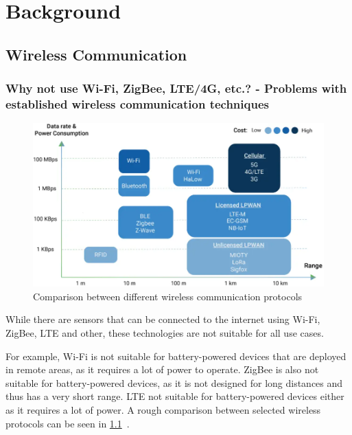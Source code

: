 \chapter{Background}

\section{Wireless Communication}


\subsection{Why not use Wi-Fi, ZigBee, \ac{LTE}/4G, etc.? - Problems with established wireless communication techniques}

\begin{figure}[h]
    \centering
    \includegraphics[width=1\textwidth]{pictures/lora/comparison-wireless-protocols.png}
    \caption{Comparison between different wireless communication protocols~\protect\cite{wang_comparison_2021}}\label{pic:wireless-protocols-comparison}
\end{figure}


While there are sensors that can be connected to the internet using Wi-Fi, ZigBee, \ac{LTE} and other, these technologies are not suitable for all use cases.

For example, Wi-Fi is not suitable for battery-powered devices that are deployed in remote areas, as it requires a lot of power to operate.
ZigBee is also not suitable for battery-powered devices, as it is not designed for long distances and thus has a very short range.
\ac{LTE} not suitable for battery-powered devices either as it requires a lot of power.
A rough comparison between selected wireless protocols can be seen in \cref{pic:wireless-protocols-comparison}~\cite{wang_comparison_2021}.

